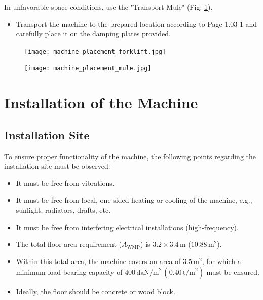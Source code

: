 \noindent In unfavorable space conditions, use the "Transport Mule" (Fig. \ref{fig:machine_placement_mule}).

\begin{itemize}
    \item Transport the machine to the prepared location according to Page 1.03-1 and carefully place it on the damping plates provided.
\end{itemize}

\begin{figure}[h]
\centering
\begin{minipage}[t]{0.45\textwidth}
    \centering
    \texttt{[image: machine\_placement\_forklift.jpg]} %
    \caption{}
    \label{fig:machine_placement_forklift}
\end{minipage}
\hfill
\begin{minipage}[t]{0.45\textwidth}
    \centering
    \texttt{[image: machine\_placement\_mule.jpg]} %
    \caption{}
    \label{fig:machine_placement_mule}
\end{minipage}
\end{figure}

\vspace{1em}


\section{Installation of the Machine}

\subsection{Installation Site}
To ensure proper functionality of the machine, the following points regarding the installation site must be observed:
\begin{itemize}
    \item It must be free from vibrations.
    \item It must be free from local, one-sided heating or cooling of the machine, e.g., sunlight, radiators, drafts, etc.
    \item It must be free from interfering electrical installations (high-frequency).
    \item The total floor area requirement ($A_\text{WMP}$) is $3.2 \times 3.4 \, \text{m}$ ($10.88 \, \text{m}^2$).
    \item Within this total area, the machine covers an area of $3.5 \, \text{m}^2$, for which a minimum load-bearing capacity of $400 \, \text{daN/m}^2 \, (0.40 \, \text{t/m}^2)$ must be ensured.
    \item Ideally, the floor should be concrete or wood block.
\end{itemize}

